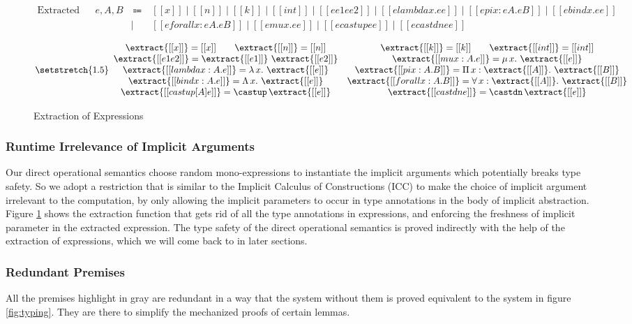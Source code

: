 \begin{figure}
    \centering
    \begin{equation*}
        \begin{array}{llcl}
            \text{Extracted Expressions} & e, A, B & ~ \Coloneqq ~ & [[x]] \mid [[n]] \mid [[k]] \mid [[int]] \mid [[ee1 ee2]] \mid [[elambda x. ee]] \mid [[epi x : eA. eB]] \mid [[ebind x. ee]] \\
            & & \mid & [[eforall x : eA. eB]] \mid [[emu x. ee]] \mid [[ecastup ee]] \mid [[ecastdn ee]]
        \end{array}
    \end{equation*}

    \begin{equation*}
    {\setstretch{1.5}
    \begin{array}{cc}
        \extract{[[x]]} = [[x]] \qquad
        \extract{[[n]]} = [[n]] &
        \extract{[[k]]} = [[k]] \qquad
        \extract{[[int]]} = [[int]] \\
        \extract{[[e1 e2]]} = \extract{[[e1]]} ~ \extract{[[e2]]} &
        \extract{[[mu x : A. e]]} = \mu \, x. ~ \extract{[[e]]} \\
        \extract{[[lambda x : A. e]]} = \lambda \, x. ~ \extract{[[e]]} &
        \extract{[[pi x : A. B]]} = \Pi \, x : \extract{[[A]]}. ~ \extract{[[B]]} \\
        \extract{[[bind x : A. e]]} = \Lambda \, x. ~ \extract{[[e]]} &
        \extract{[[forall x : A. B]]} = \forall \, x : \extract{[[A]]}. ~ \extract{[[B]]} \\
        \extract{[[castup [A] e]]} = \castup \, \extract{[[e]]} &
        \extract{[[castdn e]]} = \castdn \, \extract{[[e]]}
    \end{array}
    }
    \end{equation*}

    \caption{Extraction of Expressions}
    \label{fig:extraction}
\end{figure}

\subsubsection{Runtime Irrelevance of Implicit Arguments}

Our direct operational semantics choose random mono-expressions to instantiate
the implicit arguments which potentially breaks type safety. So we adopt a
restriction that is similar to the Implicit Calculus of Constructions (ICC) \cite{miquel2001implicit}
to make the choice of implicit argument irrelevant to the computation, by only
allowing the implicit parameters to occur in type annotations in the body of
implicit abstraction. Figure \ref{fig:extraction} shows the extraction function
that gets rid of all the type annotations in expressions, and enforcing the
freshness of implicit parameter in the extracted expression. The type safety of
the direct operational semantics is proved indirectly with the help of
the extraction of expressions, which we will come back to in later sections.

\subsubsection{Redundant Premises}

All the premises highlight in gray are redundant in a way that
the system without them is proved equivalent to the system in figure \ref{fig:typing}.
They are there to simplify the mechanized proofs of certain lemmas.

